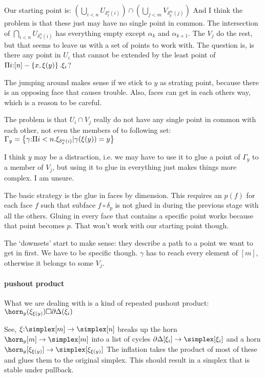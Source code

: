 \documentclass[csh.tex]{subfiles}
\begin{document}
Our starting point is:
$(\bigcup_{i<n} U_{\delta^n_x(i)}) \cap (\bigcup_{j<m} V_{\delta^m_y(j)})$
And I think the problem is that these just may have no single point in common.
The intersection of $\bigcap_{i<n} U_{\delta^n_x(i)}$ has everything empty
except $\alpha_k$ and $\alpha_{k+1}$. The $V_j$ do the rest, but that seems to
leave us with a set of points to work with. 
The question is, is there any point in $U_i$ that cannot be extended by the
least point of $\Pi i\mathord :[n]-\left\{x,\xi(y)\right\} .\xi_i$?

The jumping around makes sense if we stick to $y$ as strating point, because
there is an opposing face that causes trouble. Also, faces can get in each
others way, which is a reason to be careful.

The problem is that $U_i\cap V_j$ really do not have any single point in common 
with each other, not even the members of to following set:
$\Gamma_y = \left\{\gamma\mathord :\Pi i<n .\xi_{\delta^n_x(i)}| \gamma(\xi(y)) = y\right\}$

I think $y$ may be a distraction, i.e. we may have to use it to glue a point of 
$\Gamma_y$ to a member of $V_j$, but using it to glue in everything just makes
things more complex. I am unsure.

The basic strategy is the glue in faces by dimension. This requires an $p(f)$ 
for each face $f$ such that subface $f\circ \delta_p$ is not glued in during the
 previous stage with all the others. Gluing in every face that contains
a specific point works because that point becomes $p$. That won't work with our
starting point though.

The `downsets' start to make sense: they describe a path to a point we want to 
get in first. We have to be specific though. $\gamma$ 
has to reach every element of $[m]$, otherwise it belongs to some $V_j$.

\paragraph{pushout product}
What we are dealing with is a kind of repeated pushout product:
$\horn_y(\xi_{\xi(y)})\Box\cycle(\xi_i)$

See, $\xi\of \simplex[m]\to\simplex[n]$ breaks up the horn 
$\horn_y[m]\to \simplex[m]$ into a list of cycles
$\cycle[\xi_i]\to\simplex[\xi_i]$ and a horn 
$\horn_y[\xi_{\xi(y)}]\to \simplex[\xi_{\xi(y)}]$
The inflation takes the product of most of these and glues them to the
original simplex. This should result in a simplex that is stable under
pullback.
\end{document}
